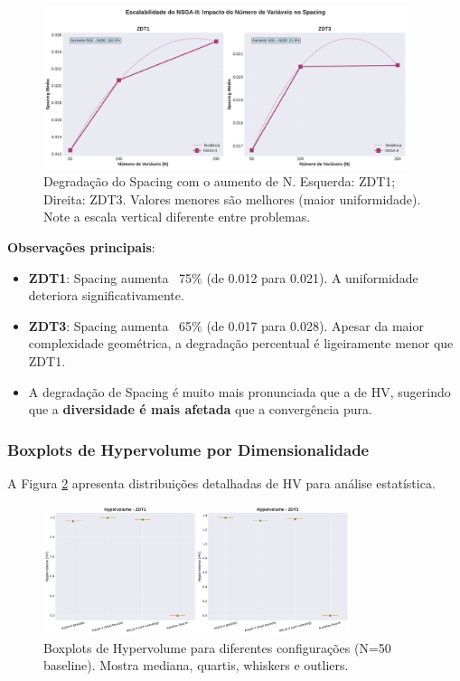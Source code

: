 \begin{figure}[h]
\centering
\includegraphics[width=0.95\textwidth]{../plots/J_spacing_nvar_scaling.pdf}
\caption{Degradação do Spacing com o aumento de N. Esquerda: ZDT1; Direita: ZDT3. Valores menores são melhores (maior uniformidade). Note a escala vertical diferente entre problemas.}
\label{fig:sp_scaling}
\end{figure}

\textbf{Observações principais}:
\begin{itemize}
  \item \textbf{ZDT1}: Spacing aumenta ~75\% (de 0.012 para 0.021). A uniformidade deteriora significativamente.
  \item \textbf{ZDT3}: Spacing aumenta ~65\% (de 0.017 para 0.028). Apesar da maior complexidade geométrica, a degradação percentual é ligeiramente menor que ZDT1.
  \item A degradação de Spacing é muito mais pronunciada que a de HV, sugerindo que a \textbf{diversidade é mais afetada} que a convergência pura.
\end{itemize}

\subsubsection{Boxplots de Hypervolume por Dimensionalidade}
A Figura \ref{fig:hv_boxplots} apresenta distribuições detalhadas de HV para análise estatística.

\begin{figure}[h]
\centering
\includegraphics[width=0.80\textwidth]{../plots/C_hypervolume_boxplots.pdf}
\caption{Boxplots de Hypervolume para diferentes configurações (N=50 baseline). Mostra mediana, quartis, whiskers e outliers.}
\label{fig:hv_boxplots}
\end{figure}

